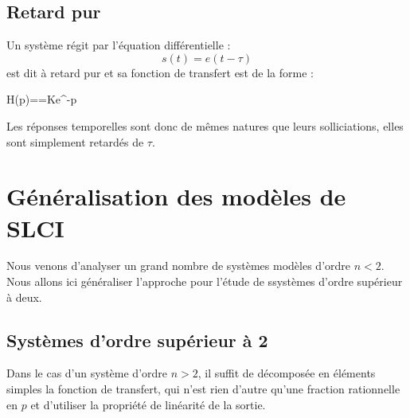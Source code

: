 \subsection{Retard pur}
Un système régit par l'équation différentielle :
\[
s(t)=e(t-\tau)
\]
est dit à retard pur et sa fonction de transfert est de la forme :
\begin{bequation}
    H(p)==Ke^{-\tau p}
\end{bequation}
Les réponses temporelles sont donc de mêmes natures que 
leurs solliciations, elles sont simplement retardés de $\tau$.
\section{Généralisation des modèles de SLCI}
Nous venons d'analyser un grand nombre de systèmes modèles d'ordre $n<2$. 
Nous allons ici généraliser l'approche pour l'étude de ssystèmes d'ordre 
supérieur à deux.
\subsection{Systèmes d'ordre supérieur à 2}
Dans le cas d'un système d'ordre $n>2$, il suffit de décomposée en éléments 
simples la fonction de transfert, qui n'est rien d'autre qu'une fraction 
rationnelle en $p$ et d'utiliser la propriété de linéarité de la sortie.

